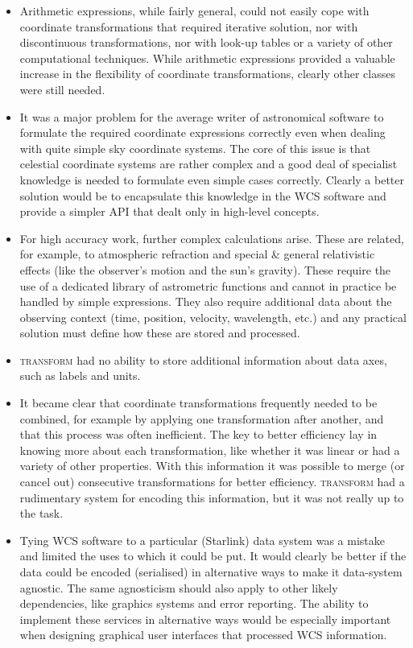 \documentclass[final,authoryear,5p,times,twocolumn]{elsarticle}
\begin{document}
\begin{itemize}

\item Arithmetic expressions, while fairly general, could not easily
  cope with coordinate transformations that required iterative
  solution, nor with discontinuous transformations, nor with look-up
  tables or a variety of other computational techniques. While
  arithmetic expressions provided a valuable increase in the
  flexibility of coordinate transformations, clearly other classes
  were still needed.

\item It was a major problem for the average writer of astronomical
  software to formulate the required coordinate expressions correctly
  even when dealing with quite simple sky coordinate systems. The core
  of this issue is that celestial coordinate systems are rather
  complex and a good deal of specialist knowledge is needed to
  formulate even simple cases correctly. Clearly a better solution
  would be to encapsulate this knowledge in the WCS software and
  provide a simpler API that dealt only in high-level concepts.

\item For high accuracy work, further complex calculations
  arise. These are related, for example, to atmospheric refraction and
  special \& general relativistic effects (like the observer's motion
  and the sun's gravity).  These require the use of a dedicated
  library of astrometric functions and cannot in practice be handled
  by simple expressions. They also require additional data about the
  observing context (time, position, velocity, wavelength, etc.) and
  any practical solution must define how these are stored and
  processed.

\item \textsc{transform} had no ability to store additional
  information about data axes, such as labels and units.

\item It became clear that coordinate transformations frequently
  needed to be combined, for example by applying one transformation
  after another, and that this process was often inefficient. The key
  to better efficiency lay in knowing more about each transformation,
  like whether it was linear or had a variety of other
  properties. With this information it was possible to merge (or
  cancel out) consecutive transformations for better
  efficiency. \textsc{transform} had a rudimentary system for encoding
  this information, but it was not really up to the task.

\item Tying WCS software to a particular (Starlink) data system was a
  mistake and limited the uses to which it could be put. It would
  clearly be better if the data could be encoded (serialised) in
  alternative ways to make it data-system agnostic. The same
  agnosticism should also apply to other likely dependencies, like
  graphics systems and error reporting.  The ability to implement
  these services in alternative ways would be especially important
  when designing graphical user interfaces that processed WCS
  information.

\end{itemize}
\end{document}
